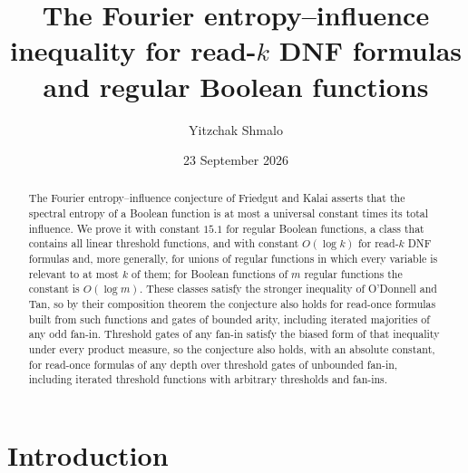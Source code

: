 \documentclass[11pt]{amsart}
\title[Entropy--influence for read-$k$ DNFs and regular functions]{The Fourier entropy--influence inequality for read-$k$ DNF formulas and regular Boolean functions}
\author{Yitzchak Shmalo}
\date{23 September 2026}
\theoremstyle{definition}
\theoremstyle{remark}
\begin{document}
\begin{abstract}
The Fourier entropy--influence conjecture of Friedgut and Kalai asserts that the spectral entropy of a Boolean
function is at most a universal constant times its total influence. We prove it with constant $15.1$ for regular
Boolean functions, a class that contains all linear threshold functions, and with constant $O(\log k)$ for read-$k$
DNF formulas and, more generally, for unions of regular functions in which every variable is relevant to at most $k$
of them; for Boolean functions of $m$ regular functions the constant is $O(\log m)$. These classes satisfy the
stronger inequality of O'Donnell and Tan, so by their composition theorem the conjecture also holds for read-once
formulas built from such functions and gates of bounded arity, including iterated majorities of any odd fan-in.
Threshold gates of any fan-in satisfy the biased form of that inequality under every product measure, so the
conjecture also holds, with an absolute constant, for read-once formulas of any depth over threshold gates of
unbounded fan-in, including iterated threshold functions with arbitrary thresholds and fan-ins.
\end{abstract}

\maketitle

\section{Introduction}
\end{document}
